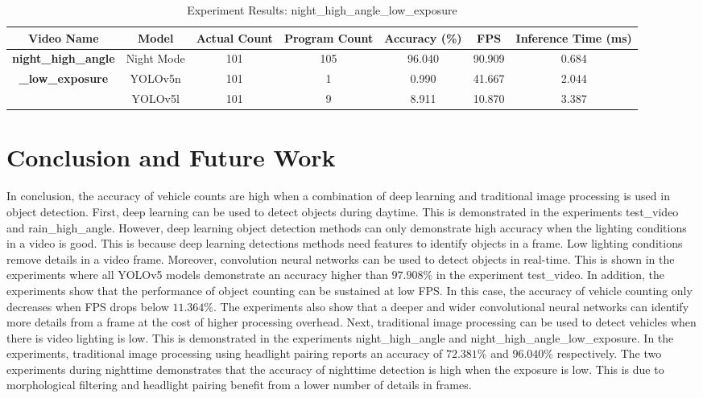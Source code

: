 \documentclass[12pt,a4paper,fleqn]{report}
\begin{document}
\begin{table}[htbp]
    \begin{adjustbox}{width=1\textwidth}
    \begin{tabular}{|c|c|c|c|c|c|c|}
    \hline
    \textbf{Video Name} & \textbf{Model} & \textbf{Actual Count} & \textbf{Program Count} & \textbf{Accuracy (\%)} & \textbf{FPS} & \textbf{Inference Time (ms)} \\ \hline
    \textbf{night\_high\_angle} & Night Mode & 101 & 105 & 96.040 & 90.909 & 0.684 \\ \cline{2-7}
    \textbf{\_low\_exposure} & YOLOv5n & 101 & 1 & 0.990 & 41.667 & 2.044 \\ \cline{2-7}
    & YOLOv5l & 101 & 9 & 8.911 & 10.870 & 3.387 \\ \hline
    \end{tabular}
    \end{adjustbox}
    \caption{Experiment Results: night\_high\_angle\_low\_exposure}
    \label{tab:result_nha_low_exp}
\end{table}

\chapter{Conclusion and Future Work}

In conclusion, the accuracy of vehicle counts are high when a combination of deep learning and
traditional image processing is used in object detection.
First, deep learning can be used to detect objects during daytime.
This is demonstrated in the experiments test\_video and rain\_high\_angle.
However, deep learning object detection methods can only demonstrate high accuracy when the
lighting conditions in a video is good.
This is because deep learning detections methods need features to identify objects in a frame.
Low lighting conditions remove details in a video frame.
Moreover, convolution neural networks can be used to detect objects in real-time.
This is shown in the experiments where all YOLOv5 models demonstrate an accuracy higher than
$97.908\%$ in the experiment test\_video.
In addition, the experiments show that the performance of object counting can be sustained at low FPS.
In this case, the accuracy of vehicle counting only decreases when FPS drops below $11.364\%$.
The experiments also show that a deeper and wider convolutional neural networks can identify more
details from a frame at the cost of higher processing overhead.
Next, traditional image processing can be used to detect vehicles when there is video lighting is
low.
This is demonstrated in the experiments night\_high\_angle and night\_high\_angle\_low\_exposure.
In the experiments, traditional image processing using headlight pairing reports an accuracy of
$72.381\%$ and $96.040\%$ respectively.
The two experiments during nighttime demonstrates that the accuracy of nighttime detection is high
when the exposure is low.
This is due to morphological filtering and headlight pairing benefit from a lower number of details
in frames.
\end{document}
